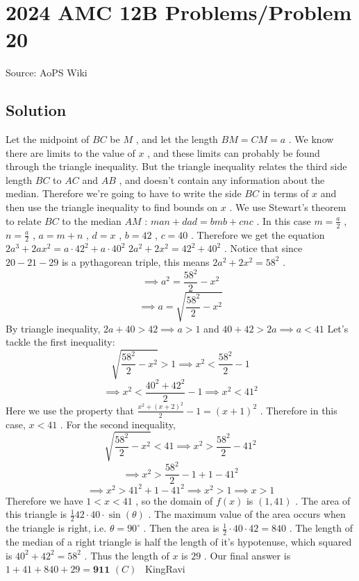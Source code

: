 \documentclass[12pt]{article}
\begin{document}
\section*{{2024 AMC 12B Problems/Problem 20}}
Source: AoPS Wiki

\subsection*{Solution}
Let the midpoint of $BC$ be $M$ , and let the length $BM = CM = a$ . We know there are limits to the value of $x$ , and these limits can probably be found through the triangle inequality. But the triangle inequality relates the third side length $BC$ to $AC$ and $AB$ , and doesn't contain any information about the median. Therefore we're going to have to write the side $BC$ in terms of $x$ and then use the triangle inequality to find bounds on $x$ . We use Stewart's theorem to relate $BC$ to the median $AM$ : $man + dad = bmb + cnc$ . In this case $m = \frac{a}2$ , $n=\frac{a}2$ , $a = m+n$ , $d = x$ , $b = 42$ , $c = 40$ . Therefore we get the equation $2a^3 + 2ax^2 = a \cdot 42^2 + a \cdot 40^2$ $2a^2 + 2x^2 = 42^2 + 40^2$ . Notice that since $20-21-29$ is a pythagorean triple, this means $2a^2 + 2x^2 = 58^2$ . \[\implies a^2 = \frac{58^2}{2}-x^2\] \[\implies a = \sqrt{\frac{58^2}{2}-x^2}\] By triangle inequality, $2a+40>42 \implies a>1$ and $40+42>2a \implies a<41$ Let's tackle the first inequality: \[\sqrt{\frac{58^2}{2}-x^2}>1 \implies x^2 < \frac{58^2}{2}-1\] \[\implies x^2 < \frac{40^2+42^2}{2}-1 \implies x^2<41^2\] Here we use the property that $\frac{x^2+(x+2)^2}{2}-1 = (x+1)^2$ . Therefore in this case, $x<41$ . For the second inequality, \[\sqrt{\frac{58^2}{2}-x^2} < 41 \implies x^2 > \frac{58^2}{2}-41^2\] \[\implies x^2 > \frac{58^2}{2}-1 + 1 - 41^2\] \[\implies x^2 > 41^2 + 1 - 41^2 \implies x^2 > 1 \implies x > 1\] Therefore we have $1<x<41$ , so the domain of $f(x)$ is $(1,41)$ . The area of this triangle is $\frac{1}{2} 42 \cdot 40 \cdot \sin(\theta)$ . The maximum value of the area occurs when the triangle is right, i.e. $\theta = 90^{\circ}$ . Then the area is $\frac{1}{2} \cdot 40 \cdot 42 = 840$ . The length of the median of a right triangle is half the length of it's hypotenuse, which squared is $40^2+42^2 = 58^2$ . Thus the length of $x$ is $29$ . Our final answer is $1+41+840+29 = \boxed{\textbf{911 } (C)}$ ~KingRavi
\end{document}
